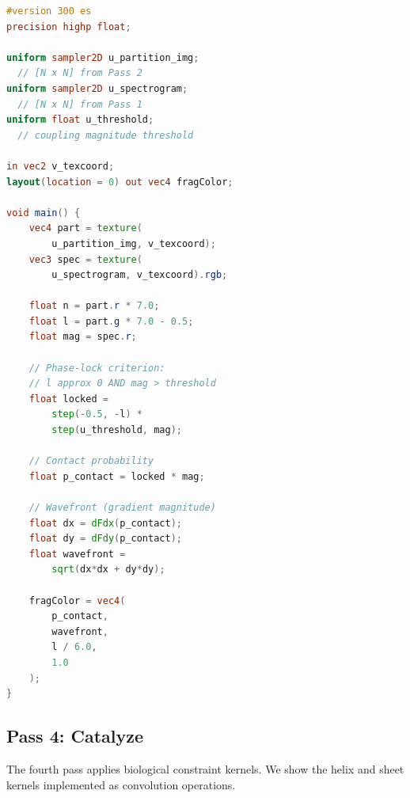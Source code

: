 \documentclass[11pt,twocolumn,a4paper]{article}
\theoremstyle{definition}
\theoremstyle{remark}
\begin{document}
\begin{lstlisting}[language=GLSL,caption={Pass 3: Observe (contact probability extraction)},label=lst:pass3]
#version 300 es
precision highp float;

uniform sampler2D u_partition_img;
  // [N x N] from Pass 2
uniform sampler2D u_spectrogram;
  // [N x N] from Pass 1
uniform float u_threshold;
  // coupling magnitude threshold

in vec2 v_texcoord;
layout(location = 0) out vec4 fragColor;

void main() {
    vec4 part = texture(
        u_partition_img, v_texcoord);
    vec3 spec = texture(
        u_spectrogram, v_texcoord).rgb;

    float n = part.r * 7.0;
    float l = part.g * 7.0 - 0.5;
    float mag = spec.r;

    // Phase-lock criterion:
    // l approx 0 AND mag > threshold
    float locked =
        step(-0.5, -l) *
        step(u_threshold, mag);

    // Contact probability
    float p_contact = locked * mag;

    // Wavefront (gradient magnitude)
    float dx = dFdx(p_contact);
    float dy = dFdy(p_contact);
    float wavefront =
        sqrt(dx*dx + dy*dy);

    fragColor = vec4(
        p_contact,
        wavefront,
        l / 6.0,
        1.0
    );
}
\end{lstlisting}

\subsection{Pass 4: Catalyze}

The fourth pass applies biological constraint kernels. We show the helix and sheet kernels implemented as convolution operations.
\end{document}
